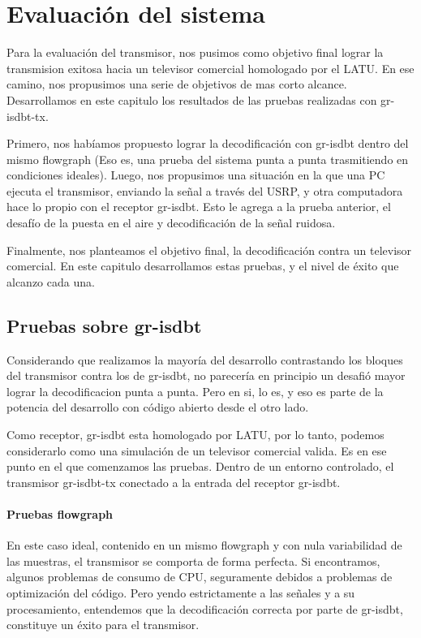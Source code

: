 \chapter{Evaluación del sistema}

Para la evaluación del transmisor, nos pusimos como objetivo final lograr la transmision exitosa hacia un televisor comercial homologado por el LATU. En ese camino, nos propusimos una serie de objetivos de mas corto alcance. Desarrollamos en este capitulo los resultados de las pruebas realizadas con gr-isdbt-tx.

Primero, nos habíamos propuesto lograr la decodificación con gr-isdbt dentro del mismo flowgraph (Eso es, una prueba del sistema punta a punta trasmitiendo en condiciones ideales). Luego, nos propusimos una situación en la que una PC ejecuta el transmisor, enviando la señal a través del USRP, y otra computadora hace lo propio con el receptor gr-isdbt. Esto le agrega a la prueba anterior, el desafío de la puesta en el aire y decodificación de la señal ruidosa.

Finalmente, nos planteamos el objetivo final, la decodificación contra un televisor comercial. En este capitulo desarrollamos estas pruebas, y el nivel de éxito que alcanzo cada una.

\section{Pruebas sobre gr-isdbt}

Considerando que realizamos la mayoría del desarrollo contrastando los bloques del transmisor contra los de gr-isdbt, no parecería en principio un desafió mayor lograr la decodificacion punta a punta. Pero en si, lo es, y eso es parte de la potencia del desarrollo con código abierto desde el otro lado. 

Como receptor, gr-isdbt esta homologado por LATU, por lo tanto, podemos considerarlo como una simulación de un televisor comercial valida. Es en ese punto en el que comenzamos las pruebas. Dentro de un entorno controlado, el transmisor gr-isdbt-tx conectado a la entrada del receptor gr-isdbt.

\subsubsection{Pruebas flowgraph}

En este caso ideal, contenido en un mismo flowgraph y con nula variabilidad de las muestras, el transmisor se comporta de forma perfecta. Si encontramos, algunos problemas de consumo de CPU, seguramente debidos a problemas de optimización del código. 
Pero yendo estrictamente a las señales y a su procesamiento, entendemos que la decodificación correcta por parte de gr-isdbt, constituye un éxito para el transmisor. 

